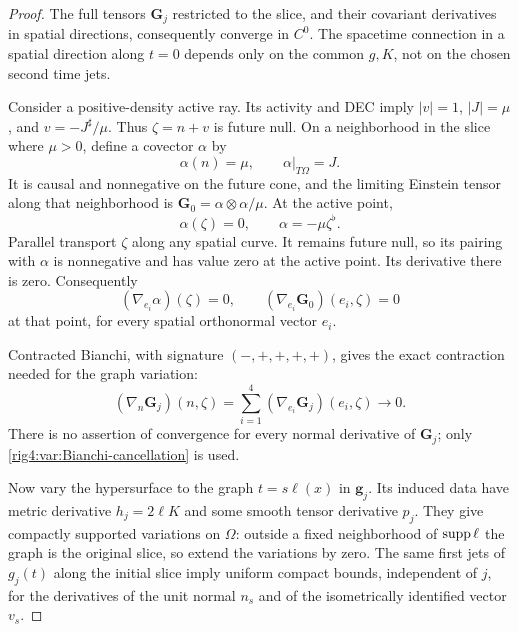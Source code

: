 \begin{proof}
The full tensors $\mathbf G_j$ restricted to the slice, and their
covariant derivatives in spatial directions, consequently converge in
$C^0$. The spacetime connection in a spatial direction along $t=0$
depends only on the common $g,K$, not on the chosen second time jets.

Consider a positive-density active ray. Its activity and DEC imply
$|v|=1$, $|J|=\mu$, and $v=-J^\sharp/\mu$. Thus
$\zeta=n+v$ is future null. On a neighborhood in the slice where $\mu>0$,
define a covector $\alpha$ by
\[
 \alpha(n)=\mu,\qquad \alpha|_{T\Omega}=J.
\]
It is causal and nonnegative on the future cone, and the limiting
Einstein tensor along that neighborhood is
$\mathbf G_0=\alpha\otimes\alpha/\mu$. At the active point,
\[
 \alpha(\zeta)=0,\qquad \alpha=-\mu\zeta^\flat.
\]
Parallel transport $\zeta$ along any spatial curve. It remains future
null, so its pairing with $\alpha$ is nonnegative and has value zero at
the active point. Its derivative there is zero. Consequently
\begin{equation}
 (\nabla_{e_i}\alpha)(\zeta)=0,
 \qquad (\nabla_{e_i}\mathbf G_0)(e_i,\zeta)=0
\label{rig4:var:tangential-cancellation}
\end{equation}
at that point, for every spatial orthonormal vector $e_i$.

Contracted Bianchi, with signature $(-,+,+,+,+)$, gives the exact
contraction needed for the graph variation:
\begin{equation}
 (\nabla_n\mathbf G_j)(n,\zeta)
     =\sum_{i=1}^4(\nabla_{e_i}\mathbf G_j)(e_i,\zeta)
       \longrightarrow0.
\label{rig4:var:Bianchi-cancellation}
\end{equation}
There is no assertion of convergence for every normal derivative of
$\mathbf G_j$; only \eqref{rig4:var:Bianchi-cancellation} is used.

Now vary the hypersurface to the graph $t=s\ell(x)$ in $\mathbf g_j$.
Its induced data have metric derivative $h_j=2\ell K$ and some smooth
tensor derivative $p_j$. They give compactly supported variations on
$\Omega$: outside a fixed neighborhood of $\operatorname{supp}\ell$ the graph is the
original slice, so extend the variations by zero. The same first jets of
$g_j(t)$ along the initial slice imply uniform compact bounds, independent
of $j$, for the derivatives of the unit normal $n_s$ and of the
isometrically identified vector $v_s$.


\end{proof}

